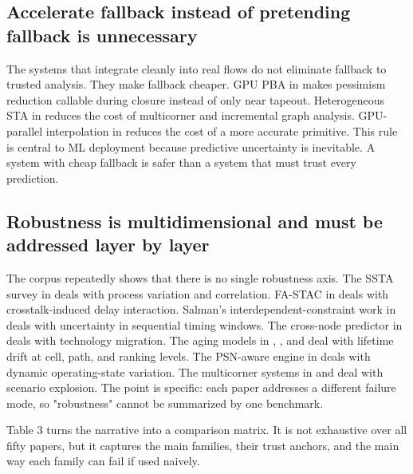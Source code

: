 \documentclass[num-refs]{wiley-article}
\begin{document}
  \subsection{Accelerate fallback instead of pretending fallback is unnecessary}

  The systems that integrate cleanly into real flows do not eliminate fallback to trusted analysis. They make fallback cheaper. GPU PBA in \cite{ref21} makes pessimism reduction callable during closure instead of only near tapeout. Heterogeneous STA in \cite{ref22} reduces the cost of multicorner and incremental graph analysis. GPU-parallel interpolation in \cite{ref11} reduces the cost of a more accurate primitive. This rule is central to ML deployment because predictive uncertainty is inevitable. A system with cheap fallback is safer than a system that must trust every prediction.


  \subsection{Robustness is multidimensional and must be addressed layer by layer}

  The corpus repeatedly shows that there is no single robustness axis. The SSTA survey in \cite{ref49} deals with process variation and correlation. FA-STAC in \cite{ref48} deals with crosstalk-induced delay interaction. Salman's interdependent-constraint work in \cite{ref46} deals with uncertainty in sequential timing windows. The cross-node predictor in \cite{ref6} deals with technology migration. The aging models in \cite{ref14}, \cite{ref15}, and \cite{ref23} deal with lifetime drift at cell, path, and ranking levels. The PSN-aware engine in \cite{ref12} deals with dynamic operating-state variation. The multicorner systems in \cite{ref16} and \cite{ref28} deal with scenario explosion. The point is specific: each paper addresses a different failure mode, so "robustness" cannot be summarized by one benchmark.


  Table 3 turns the narrative into a comparison matrix. It is not exhaustive over all fifty papers, but it captures the main families, their trust anchors, and the main way each family can fail if used naively.
\end{document}
